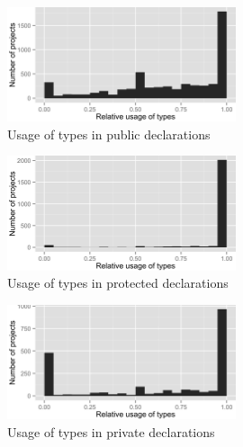 \begin{figure}[h]
\centering 
\includegraphics[width=0.6\textwidth]{../aosd_2014/analysis/result/script/class/histograms/13_Public.png} 
\caption{Usage of types in public declarations}
\end{figure}

\begin{figure}[h]
\centering 
\includegraphics[width=0.6\textwidth]{../aosd_2014/analysis/result/script/class/histograms/12_Protected.png} 
\caption{Usage of types in protected declarations}
\end{figure}

\begin{figure}[h]
\centering 
\includegraphics[width=0.6\textwidth]{../aosd_2014/analysis/result/script/class/histograms/11_Private.png} 
\caption{Usage of types in private declarations}
\end{figure}